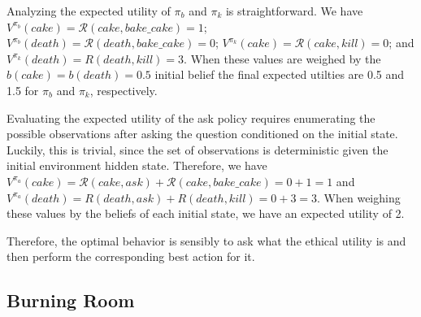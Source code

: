 \documentclass[11pt]{article}
\begin{document}
Analyzing the expected utility of $\pi_b$ and $\pi_k$ is straightforward. We have $V^{\pi_b}(cake) = \mathcal{R}(cake, bake\_cake) = 1$; $V^{\pi_b}(death) = \mathcal{R}(death, bake\_cake) = 0$; $V^{\pi_k}(cake) = \mathcal{R}(cake, kill) = 0$; and $V^{\pi_k}(death) = R(death, kill) = 3$. When these values are weighed by the $b(cake) = b(death) = 0.5$ initial belief the final expected utilties are 0.5 and 1.5 for $\pi_b$ and $\pi_k$, respectively.

Evaluating the expected utility of the ask policy requires enumerating the possible observations after asking the question conditioned on the initial state. Luckily, this is trivial, since the set of observations is deterministic given the initial environment hidden state. Therefore, we have $V^{\pi_a}(cake) = \mathcal{R}(cake, ask) + \mathcal{R}(cake, bake\_cake) = 0 + 1 = 1$ and $V^{\pi_a}(death) = R(death, ask) + R(death, kill) = 0 + 3 = 3$. When weighing these values by the beliefs of each initial state, we have an expected utility of 2.

Therefore, the optimal behavior is sensibly to ask what the ethical utility is and then perform the corresponding best action for it.



\subsection{Burning Room}
\end{document}
